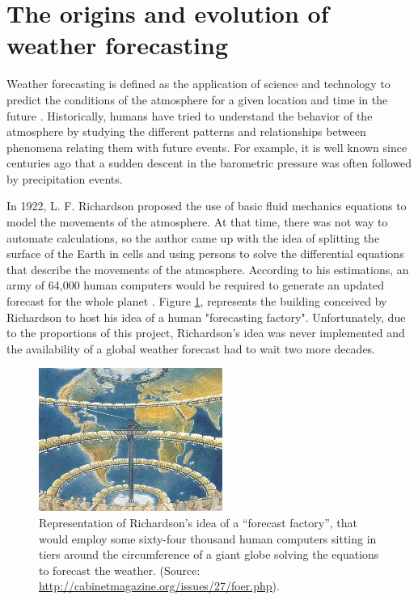 
\section{The origins and evolution of weather forecasting}

Weather forecasting is defined as the application of science and technology to predict the conditions of the atmosphere for a given location and time in the future \citep{vasquez2009weather}. Historically, humans have tried to understand the behavior of the atmosphere by studying the different patterns and relationships between phenomena relating them with future events. For example, it is well known since centuries ago that a sudden descent in the barometric pressure was often followed by precipitation events.

\medskip

In 1922, L. F. Richardson proposed the use of basic fluid mechanics equations to model the movements of the atmosphere. At that time, there was not way to automate calculations, so the author came up with the idea of splitting the surface of the Earth in cells and using persons to solve the differential equations that describe the movements of the atmosphere. According to his estimations, an army of 64,000 human computers would be required to generate an updated forecast for the whole planet \citep{richardson1922weather}. Figure \ref{human_forecasters}, represents the building conceived by Richardson to host his idea of a human "forecasting factory". Unfortunately, due to the proportions of this project, Richardson's idea was never implemented and the availability of a global weather forecast had to wait two more decades. 

\medskip

\begin{figure}[h]
 \centerline{\includegraphics[width=6cm]{human_forecasters.jpg}} \caption{Representation of Richardson's idea of a “forecast factory”, that would employ some sixty-four thousand human computers sitting in tiers around the circumference of a giant globe solving the equations to forecast the weather. (Source: \url{http://cabinetmagazine.org/issues/27/foer.php}).}\label{human_forecasters}
\end{figure}

